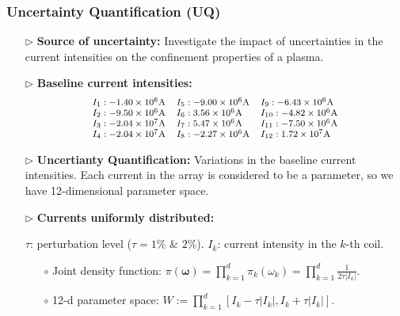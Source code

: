 \documentclass{beamer}
\begin{document}
\begin{frame}[t]
    \frametitle{Uncertainty Quantification (UQ)}
    \begin{itemize}[leftmargin=5pt]
        \item[$\triangleright$] \textcolor{myblue3}{\bf Source of uncertainty:} {\footnotesize Investigate the impact of \textcolor{myblue3}{uncertainties in the current intensities} on the confinement properties of a plasma.}
        
        \item[$\triangleright$] \textcolor{myred}{\bf Baseline current intensities:} 
        \[
        \footnotesize
        \begin{array}{lll}
        I_1: -1.40\times 10^6\text{A} &I_5: -9.00\times 10^6\text{A} &I_9:  -6.43\times 10^6\text{A} \\
        I_2: -9.50\times 10^6\text{A} &I_6: 3.56\times 10^6\text{A}  & I_{10}:  -4.82\times 10^6\text{A} \\
        I_3: -2.04\times 10^7\text{A} &I_7:  5.47\times 10^6\text{A}  &I_{11}:  -7.50\times 10^6\text{A} \\
        I_4: -2.04\times 10^7\text{A} &I_8: -2.27\times 10^6\text{A} &I_{12}:  1.72\times 10^7\text{A} 
        \end{array}
        \]
        \item[$\triangleright$] \textcolor{myblue3}{\bf Uncertianty Quantification:} {\footnotesize Variations in the baseline current intensities. Each current in the array is considered to be a parameter, so we have 12-dimensional parameter space.}
        
        
        \item[$\triangleright$] \textcolor{myblue3}{\bf Currents uniformly distributed:} 

        {\footnotesize
        \textcolor{mygray3}{$\tau$: perturbation level ($\tau= 1\%$ \& $2\%$). \quad $I_k$: current intensity in the $k$-th coil.}
        

        \begin{itemize}[leftmargin=15pt]   
            \item[$\circ$] Joint density function: $\displaystyle
             \pi \left(\boldsymbol{\omega}\right)=\prod_{k=1}^{d} \pi_k\left(\omega_{k}\right)=\prod_{k=1}^{d} \frac{1}{2\tau |I_k|}$.
            \item[$\circ$] 12-d parameter space: $\displaystyle W := \prod_{k=1}^{d}\left[I_k-\tau|I_k|,I_k+\tau|I_k|\right]$.
        \end{itemize}
        \par}
    \end{itemize}
\end{frame}	
\end{document}
